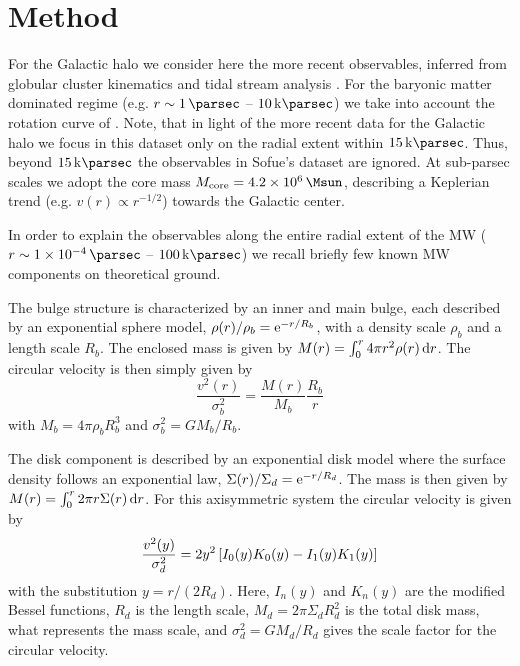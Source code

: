 \section{Method}
\label{sec:method}
For the Galactic halo we consider here the more recent observables, inferred from globular cluster kinematics \citep{2018arXiv180411348W} and tidal stream analysis \citep{2015ApJ...803...80K,2014MNRAS.445.3788G}. For the baryonic matter dominated regime (e.g. $r \sim \SI{1}{\parsec}$ -- $\SI{10}{\kilo\parsec}$) we take into account the rotation curve of \citet{2013PASJ...65..118S}. Note, that in light of the more recent data for the Galactic halo we focus in this dataset only on the radial extent within $\SI{15}{\kilo\parsec}$. Thus, beyond $\SI{15}{\kilo\parsec}$ the observables in Sofue's dataset are ignored. At sub-parsec scales we adopt the core mass $M_{\rm core} = \SI{4.2E6}{\Msun}$, describing a Keplerian trend (e.g. $v(r) \propto r^{-1/2}$) towards the Galactic center. %

In order to explain the observables along the entire radial extent of the MW ($r \sim \SI{1E-4}{\parsec}$ -- $\SI{100}{\kilo\parsec}$) we recall briefly few known MW components on theoretical ground.

The bulge structure is characterized by an inner and main bulge, each described by an exponential sphere model, $\rho(r)/\rho_{b} = \mathrm{e}^{-r/R_b}$, with a density scale $\rho_b$ and a length scale $R_b$. The enclosed mass is given by $M(r) = \int_0^r 4\pi r^2 \rho(r) \mathop{}\!\mathrm{d} r$. The circular velocity is then simply given by \begin{equation}
	\frac{v^2(r)}{\sigma_b^2} = \frac{M(r)}{M_b} \frac{R_b}{r}
\end{equation} with $M_b = 4\pi\rho_b R_b^3$ and $\sigma_b^2 = G M_b/R_b$.

The disk component is described by an exponential disk model where the surface density follows an exponential law, $\Sigma(r)/\Sigma_d = \mathrm{e}^{-r/R_d}$. The mass is then given by $M(r) = \int_0^r 2\pi r \Sigma(r) \mathop{}\!\mathrm{d} r$. For this axisymmetric system the circular velocity is given by \begin{equation}
	\frac{v^2(y)}{\sigma_d^2} = 2 y^2 \qbracket{I_0(y) K_0(y) - I_1(y) K_1(y)}
\end{equation} with the substitution $y=r/(2R_d)$. Here, $I_n(y)$ and $K_n(y)$ are the modified Bessel functions, $R_d$ is the length scale, $M_d = 2\pi \Sigma_d R_d^2$ is the total disk mass, what represents the mass scale, and $\sigma_d^2 = G M_d/R_d$ gives the scale factor for the circular velocity.


